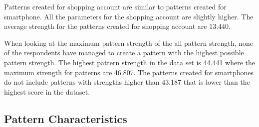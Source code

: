     Patterns created for shopping account are similar to patterns created for smartphone. All the parameters for the shopping account are slightly higher. The average strength for the patterns created for shopping account are 13.440.

    When looking at the maximum pattern strength of the all pattern strength, none of the respondents have managed to create a pattern with the highest possible pattern strength. The highest pattern strength in the data set is 44.441 where the maximum strength for patterns are 46.807. The patterns created for smartphones do not include patterns with strengths higher than 43.187 that is lower than the highest score in the dataset. 


	\subsection{Pattern Characteristics}




